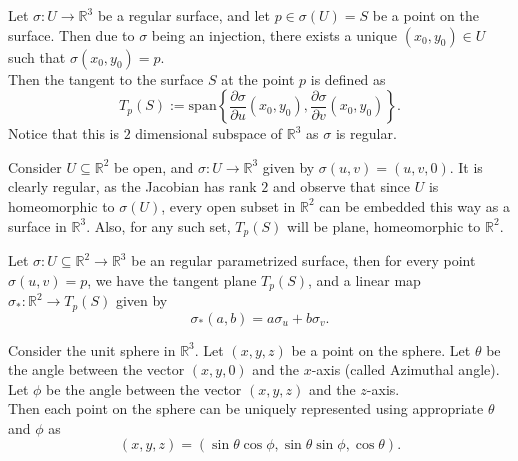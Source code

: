 \vspace{0.4cm}
\begin{definition}
    Let $\sigma:U\to \mathbb{R}^{3}$ be a regular surface, and let $p\in\sigma(U)=S$ be a point on the surface. Then due to $\sigma$ being an injection, there exists a unique $(x_{0},y_{0})\in U$ such that $\sigma(x_{0},y_{0})=p$.\\ 
    Then the tangent to the surface $S$ at the point $p$ is defined as $$T_{p}(S):=\text{span}\left\{\frac{\partial\sigma}{\partial u}(x_{0},y_{0}),\frac{\partial\sigma}{\partial v}(x_{0},y_{0})\right\}.$$
    Notice that this is $2$ dimensional subspace of $\mathbb{R}^{3}$ as $\sigma$ is regular.
\end{definition}
\vspace{0.4cm}
\begin{eg}
    Consider $U\subseteq\mathbb{R}^{2}$ be open, and $\sigma:U\to \mathbb{R}^{3}$ given by $\sigma(u,v)=(u,v,0)$. It is clearly regular, as the Jacobian has rank $2$ and observe that since $U$ is homeomorphic to $\sigma(U)$, every open subset in $\mathbb{R}^{2}$ can be embedded this way as a surface in $\mathbb{R}^{3}$. Also, for any such set, $T_{p}(S)$ will be plane, homeomorphic to $\mathbb{R}^{2}$.
\end{eg}
\vspace{0.4cm}
\begin{eg}
    Let $\sigma:U\subseteq \mathbb{R}^{2}\to \mathbb{R}^{3}$ be an regular parametrized surface, then for every point $\sigma(u,v)=p$, we have the tangent plane $T_{p}(S)$, and a linear map $\sigma_{*}:\mathbb{R}^{2}\to T_{p}(S)$ given by $$\sigma_{*}(a,b)=a\sigma_{u}+b\sigma_{v}.$$
\end{eg}
\vspace{0.4cm}
\begin{eg}
    Consider the unit sphere in $\mathbb{R}^{3}$. Let $(x,y,z)$ be a point on the sphere. Let $\theta$ be the angle between the vector $(x,y,0)$ and the $x$-axis (called Azimuthal angle). Let $\phi$ be the angle between the vector $(x,y,z)$ and the $z$-axis.\\ 
    Then each point on the sphere can be uniquely represented using appropriate $\theta$ and $\phi$ as $$(x,y,z)=(\sin\theta\cos\phi,\sin\theta\sin\phi,\cos\theta).$$
\end{eg}
\vspace{0.4cm}
